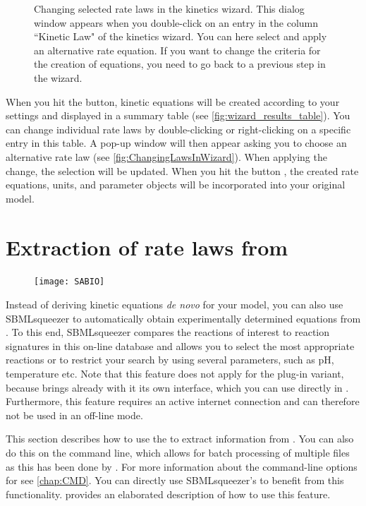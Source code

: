 \begin{figure}
\caption[Changing selected rate laws in the kinetics wizard]{Changing selected rate laws in the kinetics wizard.
This dialog window appears when you double-click on an entry in the column ``Kinetic Law" of the kinetics wizard.
You can here select and apply an alternative rate equation.
If you want to change the criteria for the creation of equations, you need to go back to a previous step in the wizard.}
\label{fig:ChangingLawsInWizard}
\end{figure}

When you hit the  button, kinetic equations will be created according to your settings and displayed in a summary table (see \vref{fig:wizard_results_table}).
You can change individual rate laws by double-clicking or right-clicking on a specific entry in this table.
A pop-up window will then appear asking you to choose an alternative rate law (see \vref{fig:ChangingLawsInWizard}).
When applying the change, the selection will be updated.
When you hit the button , the created rate equations, units, and parameter objects will be incorporated into your original model.

\section{Extraction of rate laws from \SABIO}

\begin{figure}
\vspace{\wrapfigspace}
\texttt{[image: SABIO]}
\end{figure}
Instead of deriving kinetic equations \emph{de novo} for your model, you can also use SBMLsqueezer to automatically obtain experimentally determined equations from \SABIO.
To this end, SBMLsqueezer compares the reactions of interest to reaction signatures in this on-line database and allows you to select the most appropriate reactions or to restrict your search by using several parameters, such as pH, temperature etc.
Note that this feature does not apply for the \CellDesigner plug-in variant,
because \CellDesigner brings already with it its own \SABIO interface, which you can use directly in \CellDesigner.
Furthermore, this feature requires an active internet connection and can therefore not be used in an off-line mode.

This section describes how to use the \GUI to extract information from \SABIO.
You can also do this on the command line, which allows for batch processing of multiple \SBML files as this has been done by \citet{Buechel2013}.
For more information about the command-line options for \SABIO see \vref{chap:CMD}.
You can directly use SBMLsqueezer's \API to benefit from this functionality.  provides an elaborated description of how to use this feature.

